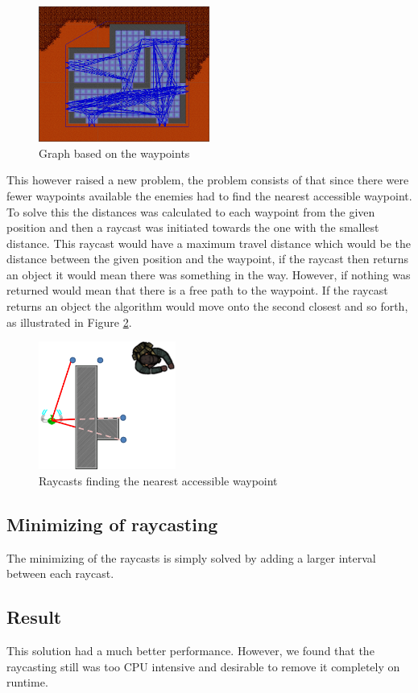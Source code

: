 \begin{figure}[H]
\begin{center}
	\includegraphics[width=0.5\textwidth]{figures/astar/waypointsGraph}
	\caption{Graph based on the waypoints}
	\label{waypointgraph}\end{center}
\end{figure}
This however raised a new problem, the problem consists of that since there were fewer waypoints available the enemies had to find the nearest accessible waypoint.
To solve this the distances was calculated to each waypoint from the given position and then a raycast was initiated towards the one with the smallest distance.
This raycast would have a maximum travel distance which would be the distance between the given position and the waypoint, if the raycast then returns an object it would mean there was something in the way. However, if nothing was returned would mean that there is a free path to the waypoint.
If the raycast returns an object the algorithm would move onto the second closest and so forth, as illustrated in Figure \ref{nearestWaypoint}.
\begin{figure}[H]
\begin{center}

	\includegraphics[width=0.4\textwidth]{figures/astar/findNearestWaypoint}
	\caption{Raycasts finding the nearest accessible waypoint}
	\label{nearestWaypoint}
	
\end{center}
\end{figure}

\subsection*{Minimizing of raycasting}
The minimizing of the raycasts is simply solved by adding a larger interval between each raycast.

\subsection*{Result}
This solution had a much better performance. However, we found that the raycasting still was too CPU intensive and desirable to remove it completely on runtime.